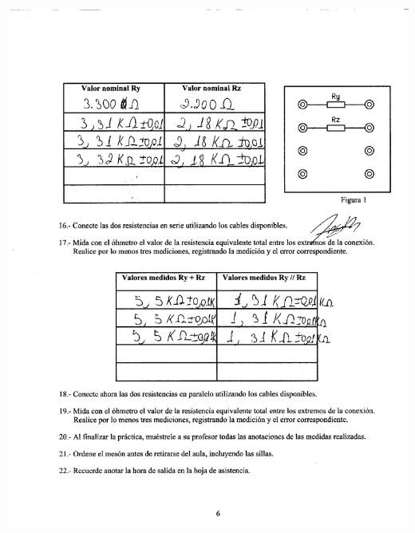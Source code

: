 \documentclass[12pt]{article}
\begin{document}
	\includegraphics[width=15cm,height=20cm]{anexo5}\\
	
\end{document}
